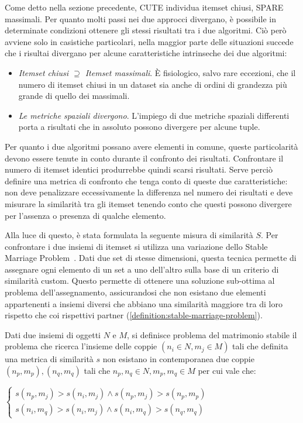 Come detto nella sezione precedente, CUTE individua itemset chiusi, SPARE massimali.
Per quanto molti passi nei due approcci divergano, è possibile in determinate condizioni ottenere gli stessi risultati tra i due algoritmi.
Ciò però avviene solo in casistiche particolari, nella maggior parte delle situazioni succede che i risultai divergano per alcune caratteristiche intrinseche dei due algoritmi:

\begin{itemize}
    \item \textit{Itemset chiusi \(\supseteq\) Itemset massimali}. È fisiologico, salvo rare eccezioni, che il numero di itemset chiusi in un dataset sia anche di ordini di grandezza più grande di quello dei massimali.
    \item \textit{Le metriche spaziali divergono}.
   L'impiego di due metriche spaziali differenti porta a risultati che in assoluto possono divergere per alcune tuple.
\end{itemize}

Per quanto i due algoritmi possano avere elementi in comune, queste particolarità devono essere tenute in conto durante il confronto dei risultati.
Confrontare il numero di itemset identici produrrebbe quindi scarsi risultati.
Serve perciò definire una metrica di confronto che tenga conto di queste due caratteristiche: non deve penalizzare eccessivamente la differenza nel numero dei risultati e deve misurare la similarità tra gli itemset tenendo conto che questi possono divergere per l'assenza o presenza di qualche elemento.

Alla luce di questo, è stata formulata la seguente misura di similarità \(S\).
Per confrontare i due insiemi di itemset si utilizza una variazione dello Stable Marriage Problem~\cite{mcvitie1971stable}.
Dati due set di stesse dimensioni, questa tecnica permette di assegnare ogni elemento di un set a uno dell'altro sulla base di un criterio di similarità custom.
Questo permette di ottenere una soluzione sub-ottima al problema dell'assegnamento, assicurandosi che non esistano due elementi appartenenti a insiemi diversi che abbiano una similarità maggiore tra di loro rispetto che coi rispettivi partner (\cref{definition:stable-marriage-problem}).

\begin{definition}\label{definition:stable-marriage-problem}

 Dati due insiemi di oggetti \(N\) e \(M\), si definisce problema del matrimonio stabile il problema che ricerca l'insieme delle coppie \((n_i \in N, m_j \in M)\) tali che definita una metrica di similarità \(s\) non esistano in contemporanea due coppie \((n_p, m_p),(n_q,m_q)\) tali che  \(n_p,n_q \in N,m_p,m_q \in M\) per cui vale che: 
  \begin{center}
  \(
    \begin{cases}
     s(n_p,m_j) > s(n_i, m_j) \land s(n_p,m_j) > s(n_p,m_p) \\
     s(n_i, m_q) > s(n_i, m_j) \land s(n_i, m_q) > s(n_q, m_q)
    \end{cases}
    \)
  \end{center}
\end{definition}

